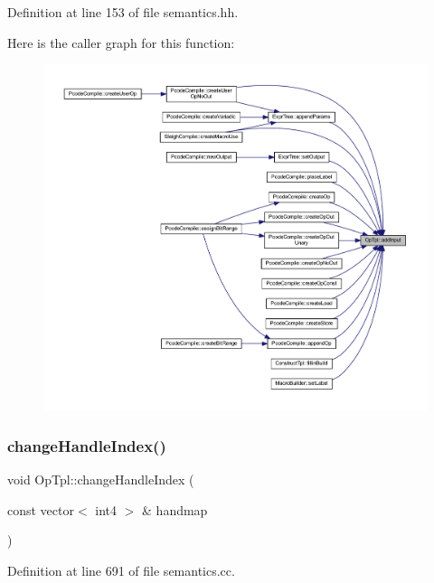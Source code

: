 Definition at line 153 of file semantics.\+hh.

Here is the caller graph for this function\+:
\nopagebreak
\begin{figure}[H]
\begin{center}
\leavevmode
\includegraphics[width=350pt]{class_op_tpl_a59a7f870a779794d1ea68caab003c62d_icgraph}
\end{center}
\end{figure}
\mbox{\label{class_op_tpl_a302870e8758b00eee4237324a6d089fa}} 
\subsubsection{\texorpdfstring{changeHandleIndex()}{changeHandleIndex()}}
{\footnotesize\ttfamily void Op\+Tpl\+::change\+Handle\+Index (\begin{DoxyParamCaption}\item[{const vector$<$ int4 $>$ \&}]{handmap }\end{DoxyParamCaption})}



Definition at line 691 of file semantics.\+cc.


